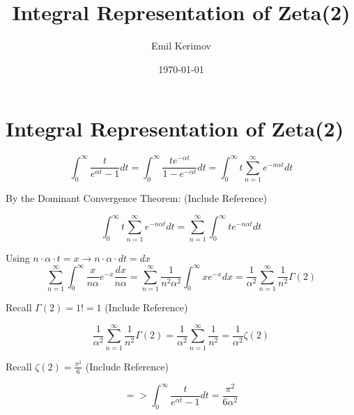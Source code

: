 ﻿\documentclass[a4paper]{article}
\title{Integral Representation of Zeta(2)}
\author{Emil Kerimov}
\date{\today}
\begin{document}
\maketitle


\section{Integral Representation of Zeta(2)}\label{iz2:Integral Representation of Zeta(2)} 

$$
\int_{0}^{\infty}\frac{t}{e^{\alpha t}-1}dt
=\int_{0}^{\infty}\frac{te^{-\alpha t}}{1-e^{-\alpha t}}dt 
= \int_{0}^{\infty} t\sum\limits_{n=1}^{\infty} e^{-n\alpha t}dt
$$

By the Dominant Convergence Theorem: (Include Reference)

$$ \int_{0}^{\infty} t\sum\limits_{n=1}^{\infty} e^{-n\alpha t} dt
=\sum\limits_{n=1}^{\infty} \int_{0}^{\infty}  te^{-n\alpha t}dt$$

Using  $n\cdot \alpha \cdot t = x  \rightarrow n\cdot \alpha \cdot dt = dx$ 
$$
\sum\limits_{n=1}^{\infty} \int_{0}^{\infty}  \frac{x}{n\alpha}e^{-x}\frac{dx}{n\alpha}
=\sum\limits_{n=1}^{\infty} \frac{1}{n^2 \alpha^2 }\int_{0}^{\infty}  xe^{-x}dx
=\frac{1}{\alpha^2}\sum\limits_{n=1}^{\infty} \frac{1}{n^2}\Gamma(2)
$$

Recall $\Gamma(2) = 1! = 1$ (Include Reference)

$$\frac{1}{\alpha^2}\sum\limits_{n=1}^{\infty} \frac{1}{n^2}\Gamma(2)
=\frac{1}{\alpha^2}\sum\limits_{n=1}^{\infty} \frac{1}{n^2}
= \frac{1}{\alpha^2} \zeta(2)
$$

Recall $\zeta(2) = \frac{\pi^2}{6}$ (Include Reference)

$$
=>   \int_{0}^{\infty}\frac{t}{e^{\alpha t}-1}dt
=\frac{\pi^2}{6\alpha^2}
$$
\end{document}
